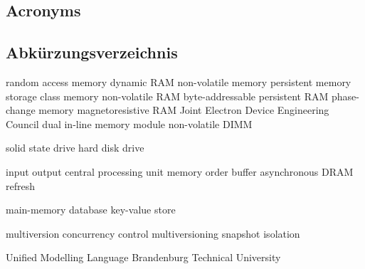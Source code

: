 %
%
%
%
\begin{en}
\chapter{Acronyms}
\end{en}
\begin{de}
\chapter{Abk\"urzungsverzeichnis}
\end{de}
\label{sec:acronyms}
%
\begin{multicols}{2}
\begin{acronym}[NVRAM]		%

	 {random access memory}
	 {dynamic RAM}
     {non-volatile memory}
     {persistent memory}
     {storage class memory}
	 {non-volatile RAM}
	 {byte-addressable persistent RAM}
     {phase-change memory}
     {magnetoresistive RAM}
     {Joint Electron Device Engineering Council}
     {dual in-line memory module}
     {non-volatile DIMM}

	 {solid state drive}
	 {hard disk drive}

     {input output}
     {central processing unit}
     {memory order buffer}
	 {asynchronous DRAM refresh}

     {main-memory database}
     {key-value store}

     {multiversion concurrency control}
     {multiversioning}
     {snapshot isolation}

	 {Unified Modelling Language}
	 {Brandenburg Technical University}

\end{acronym}
\end{multicols}
%
%

